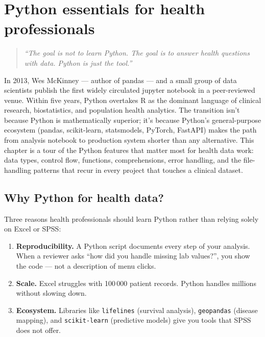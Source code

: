 \chapter{Python essentials for health professionals}
\label{ch:python-essentials}

\begin{quote}
\emph{``The goal is not to learn Python. The goal is to answer health questions with data. Python is just the tool.''}
\end{quote}

In 2013, Wes McKinney --- author of pandas --- and a small group of data scientists publish the first widely circulated jupyter notebook in a peer-reviewed venue. Within five years, Python overtakes R as the dominant language of clinical research, biostatistics, and population health analytics. The transition isn't because Python is mathematically superior; it's because Python's general-purpose ecosystem (pandas, scikit-learn, statsmodels, PyTorch, FastAPI) makes the path from analysis notebook to production system shorter than any alternative. This chapter is a tour of the Python features that matter most for health data work: data types, control flow, functions, comprehensions, error handling, and the file-handling patterns that recur in every project that touches a clinical dataset.

\section{Why Python for health data?}

Three reasons health professionals should learn Python rather than relying solely on Excel or SPSS:

\begin{enumerate}
  \item \textbf{Reproducibility.} A Python script documents every step of your analysis. When a reviewer asks ``how did you handle missing lab values?'', you show the code --- not a description of menu clicks.
  \item \textbf{Scale.} Excel struggles with 100\,000 patient records. Python handles millions without slowing down.
  \item \textbf{Ecosystem.} Libraries like \texttt{lifelines} (survival analysis), \texttt{geopandas} (disease mapping), and \texttt{scikit-learn} (predictive models) give you tools that SPSS does not offer.
\end{enumerate}


